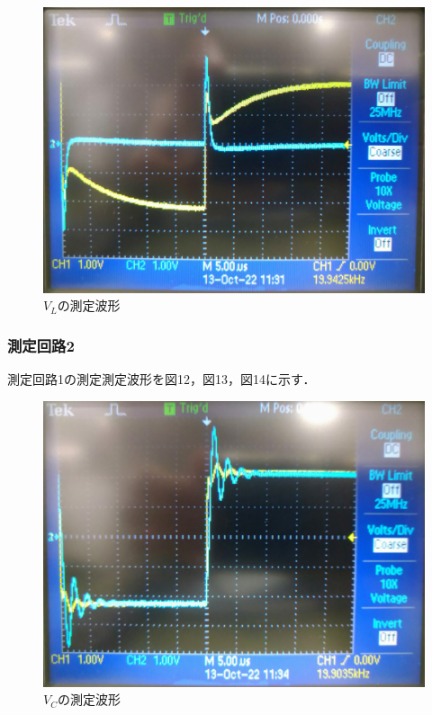 \begin{figure}[H]
    \begin{center}
        \includegraphics[keepaspectratio, scale=0.3]{DSC_0237.pdf}
        \caption{$V_L$の測定波形}
    \end{center}
\end{figure}

\subsubsection{測定回路2}
測定回路1の測定測定波形を図12，図13，図14に示す．
\begin{figure}[H]
    \begin{center}
        \includegraphics[keepaspectratio, scale=0.3]{DSC_0238.pdf}
        \caption{$V_C$の測定波形}
    \end{center}
\end{figure}

